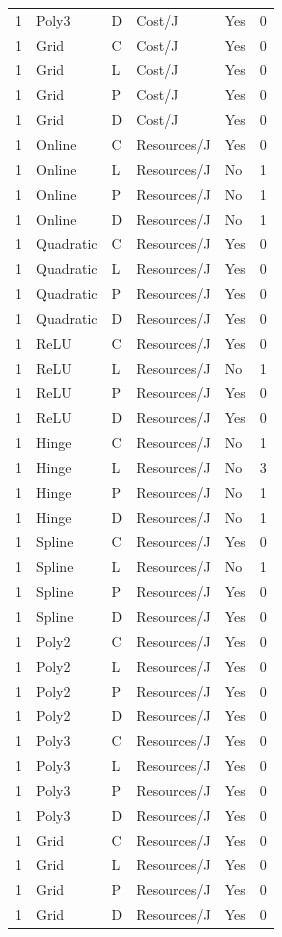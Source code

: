 \begin{longtable}{lllllr}
1 & Poly3 & D & Cost/J & Yes & 0 \\
1 & Grid & C & Cost/J & Yes & 0 \\
1 & Grid & L & Cost/J & Yes & 0 \\
1 & Grid & P & Cost/J & Yes & 0 \\
1 & Grid & D & Cost/J & Yes & 0 \\
1 & Online & C & Resources/J & Yes & 0 \\
1 & Online & L & Resources/J & No & 1 \\
1 & Online & P & Resources/J & No & 1 \\
1 & Online & D & Resources/J & No & 1 \\
1 & Quadratic & C & Resources/J & Yes & 0 \\
1 & Quadratic & L & Resources/J & Yes & 0 \\
1 & Quadratic & P & Resources/J & Yes & 0 \\
1 & Quadratic & D & Resources/J & Yes & 0 \\
1 & ReLU & C & Resources/J & Yes & 0 \\
1 & ReLU & L & Resources/J & No & 1 \\
1 & ReLU & P & Resources/J & Yes & 0 \\
1 & ReLU & D & Resources/J & Yes & 0 \\
1 & Hinge & C & Resources/J & No & 1 \\
1 & Hinge & L & Resources/J & No & 3 \\
1 & Hinge & P & Resources/J & No & 1 \\
1 & Hinge & D & Resources/J & No & 1 \\
1 & Spline & C & Resources/J & Yes & 0 \\
1 & Spline & L & Resources/J & No & 1 \\
1 & Spline & P & Resources/J & Yes & 0 \\
1 & Spline & D & Resources/J & Yes & 0 \\
1 & Poly2 & C & Resources/J & Yes & 0 \\
1 & Poly2 & L & Resources/J & Yes & 0 \\
1 & Poly2 & P & Resources/J & Yes & 0 \\
1 & Poly2 & D & Resources/J & Yes & 0 \\
1 & Poly3 & C & Resources/J & Yes & 0 \\
1 & Poly3 & L & Resources/J & Yes & 0 \\
1 & Poly3 & P & Resources/J & Yes & 0 \\
1 & Poly3 & D & Resources/J & Yes & 0 \\
1 & Grid & C & Resources/J & Yes & 0 \\
1 & Grid & L & Resources/J & Yes & 0 \\
1 & Grid & P & Resources/J & Yes & 0 \\
1 & Grid & D & Resources/J & Yes & 0 \\
\end{longtable}
\endgroup



